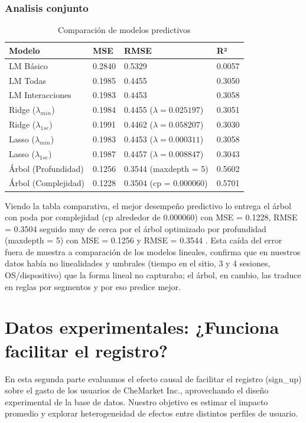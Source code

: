 \documentclass[conference]{IEEEtran}
\begin{document}
\subsubsection{Analisis conjunto}


\begin{table}[H]
\caption{Comparación de modelos predictivos}
\centering
\begin{tabular}[t]{l|l|l|l}
\hline
Modelo & MSE & RMSE & R²\\
\hline
LM Básico & 0.2840 & 0.5329 & 0.0057\\
\hline
LM Todas & 0.1985 & 0.4455 & 0.3050\\
\hline
LM Interacciones & 0.1983 & 0.4453 & 0.3058\\
\hline
Ridge ($\lambda_{min}$) & 0.1984 & 0.4455
($\lambda = 0.025197$) & 0.3051\\
\hline
Ridge ($\lambda_{1se}$) & 0.1991 & 0.4462
($\lambda = 0.058207$) & 0.3030\\
\hline
Lasso ($\lambda_{min}$) & 0.1983 & 0.4453
($\lambda = 0.000311$) & 0.3058\\
\hline
Lasso ($\lambda_{1se}$) & 0.1987 & 0.4457
($\lambda = 0.008847$) & 0.3043\\
\hline
Árbol (Profundidad) & 0.1256 & 0.3544
(maxdepth = 5) & 0.5602\\
\hline
Árbol (Complejidad) & 0.1228 & 0.3504
(cp = 0.000060) & 0.5701\\
\hline
\end{tabular}
\end{table}


Viendo la tabla comparativa, el mejor desempeño predictivo lo entrega el árbol con poda por complejidad (cp alrededor de  0.000060) con MSE = 0.1228, RMSE = 0.3504 seguido muy de cerca por el árbol optimizado por profundidad (maxdepth = 5) con MSE = 0.1256 y  RMSE = 0.3544 . Esta caída del error fuera de muestra a comparación de los modelos lineales, confirma que en nuestros datos había no linealidades y umbrales (tiempo en el sitio, 3 y 4 sesiones, OS/dispositivo) que la forma lineal no capturaba; el árbol, en cambio, las traduce en reglas por segmentos y por eso predice mejor.


\section{Datos experimentales: ¿Funciona facilitar el registro?}

En esta segunda parte evaluamos el efecto causal de facilitar el registro (sign\_up) sobre el gasto de los usuarios de CheMarket Inc., aprovechando el diseño experimental de la base de datos.
Nuestro objetivo es estimar el impacto promedio y explorar heterogeneidad de efectos entre distintos perfiles de usuario.
\end{document}
